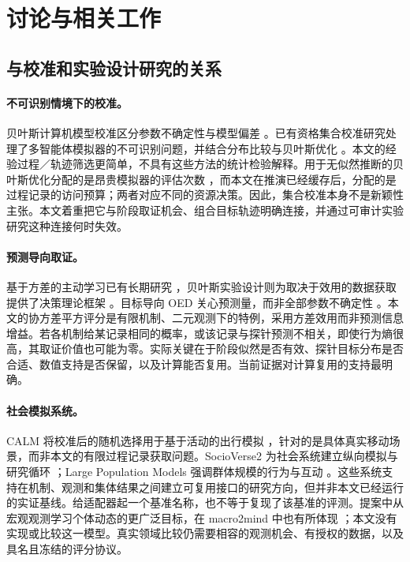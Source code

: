 \section{讨论与相关工作}
\subsection{与校准和实验设计研究的关系}
\paragraph{不可识别情境下的校准。}
贝叶斯计算机模型校准区分参数不确定性与模型偏差 \citep{kennedy2001}。已有资格集合校准研究处理了多智能体模拟器的不可识别问题，并结合分布比较与贝叶斯优化 \citep{bai2022}。本文的经验过程／轨迹筛选更简单，不具有这些方法的统计检验解释。用于无似然推断的贝叶斯优化分配的是昂贵模拟器的评估次数 \citep{gutmann2016}，而本文在推演已经缓存后，分配的是过程记录的访问预算；两者对应不同的资源决策。因此，集合校准本身不是新颖性主张。本文着重把它与阶段取证机会、组合目标轨迹明确连接，并通过可审计实验研究这种连接何时失效。

\paragraph{预测导向取证。}
基于方差的主动学习已有长期研究 \citep{cohn1996}，贝叶斯实验设计则为取决于效用的数据获取提供了决策理论框架 \citep{chaloner1995}。目标导向 OED 关心预测量，而非全部参数不确定性 \citep{attia2018,zhong2026}。本文的协方差平方评分是有限机制、二元观测下的特例，采用方差效用而非预测信息增益。若各机制给某记录相同的概率，或该记录与探针预测不相关，即使行为熵很高，其取证价值也可能为零。实际关键在于阶段似然是否有效、探针目标分布是否合适、数值支持是否保留，以及计算能否复用。当前证据对计算复用的支持最明确。

\paragraph{社会模拟系统。}
CALM 将校准后的随机选择用于基于活动的出行模拟 \citep{cheng2026}，针对的是具体真实移动场景，而非本文的有限过程记录获取问题。SocioVerse2 为社会系统建立纵向模拟与研究循环 \citep{zhang2026}；Large Population Models 强调群体规模的行为与互动 \citep{chopra2025}。这些系统支持在机制、观测和集体结果之间建立可复用接口的研究方向，但并非本文已经运行的实证基线。给适配器起一个基准名称，也不等于复现了该基准的评测。提案中从宏观观测学习个体动态的更广泛目标，在 macro2mind 中也有所体现 \citep{macro2mind2026}；本文没有实现或比较这一模型。真实领域比较仍需要相容的观测机会、有授权的数据，以及具名且冻结的评分协议。

